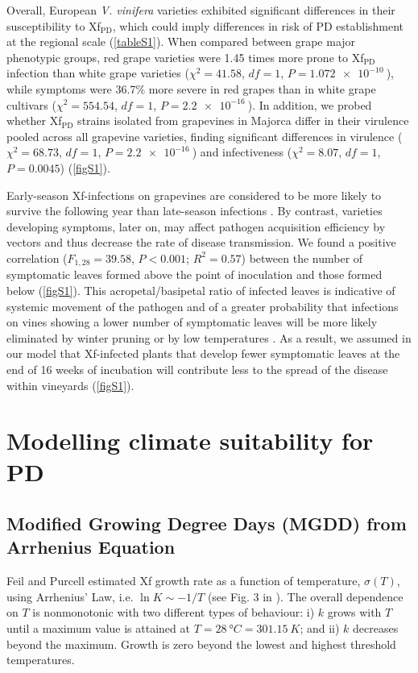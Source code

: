 Overall, European \textit{V. vinifera} varieties exhibited significant
differences in their susceptibility to Xf$_{\textrm{PD}}$, which could imply
differences in risk of PD establishment at the regional scale (\cref{tableS1}).
When compared between grape major phenotypic groups, red grape varieties were
1.45 times more prone to Xf$_{\textrm{PD}}$ infection than white grape
varieties ($\chi^2= 41.58$, $df=1$, $P=\SI{1.072e-10}{}$), while symptoms were
36.7\% more severe in red grapes than in white grape cultivars
($\chi^2=554.54$, $df=1$, $P=\SI{2.2e-16}{}$).	In addition, we probed whether
Xf$_{\textrm{PD}}$ strains isolated from grapevines in Majorca differ in their
virulence pooled across all grapevine varieties, finding significant
differences in virulence ($\chi^2 = 68.73$, $df = 1$, $P = \SI{2.2e-16}{}$) and
infectiveness ($\chi^2 = 8.07$, $df = 1$, $P =0.0045$) (\cref{figS1}).

Early-season Xf-infections on grapevines are considered to be more likely to
survive the following year than late-season infections
\cite{Feil2001,Lieth2011}. By contrast, varieties developing symptoms, later
on, may affect pathogen acquisition efficiency by vectors and thus decrease the
rate of disease transmission. We found a positive correlation ($F_{1,28} =
    39.58$, $P < 0.001$; $R^2= 0.57$) between the number of symptomatic leaves
formed above the point of inoculation and those formed below (\cref{figS1}).
This acropetal/basipetal ratio of infected leaves is indicative of systemic
movement of the pathogen and of a greater probability that infections on vines
showing a lower number of symptomatic leaves will be more likely eliminated by
winter pruning or by low temperatures \cite{Daugherty2018}. As a result, we
assumed in our model that Xf-infected plants that develop fewer symptomatic
leaves at the end of 16 weeks of incubation will contribute less to the spread
of the disease within vineyards (\cref{figS1}).

\section{Modelling climate suitability for PD}\label{app:S2}
\subsection{Modified Growing Degree Days (MGDD) from Arrhenius
    Equation}\label{app:MGDD} %

Feil and Purcell estimated Xf growth rate as a function of temperature,
$\sigma(T)$, using Arrhenius’ Law, i.e. $\ln K \sim -1/T$ (see Fig. 3 in
\cite{Feil2001}). The overall dependence on $T$ is nonmonotonic with two
different types of behaviour: i) $k$ grows with $T$ until a maximum value is
attained at $T=\SI{28}{\degree C}=\SI{301.15}{K}$; and ii) $k$ decreases beyond
the maximum. Growth is zero beyond the lowest and highest threshold
temperatures.

